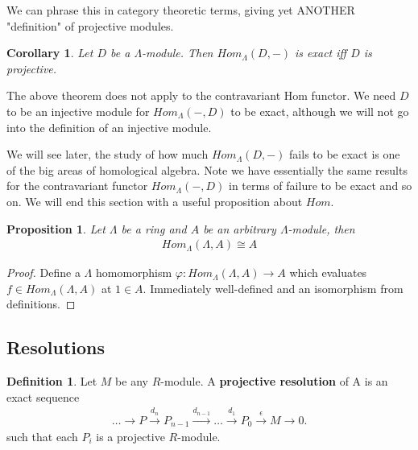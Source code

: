 \documentclass[12pt]{book}
\newtheorem{proposition}[theorem]{Proposition}
\newtheorem{corollary}[theorem]{Corollary}
\theoremstyle{definition}
\newtheorem{definition}[theorem]{Definition}
\begin{document}
We can phrase this in category theoretic terms, giving yet ANOTHER "definition" of projective modules. 
\begin{corollary}
    Let $D$ be a $\Lambda$-module. Then $Hom_\Lambda(D, -)$ is exact iff $D$ is projective. 
\end{corollary}

The above theorem does not apply to the contravariant Hom functor. We need $D$ to be an injective module for $Hom_\Lambda(-,D)$ to be exact, although we will not go into the definition of an injective module. 

We will see later, the study of how much $Hom_\Lambda(D, -)$ fails to be exact is one of the big areas of homological algebra. Note we have essentially the same results for the contravariant functor $Hom_\Lambda(-, D)$ in terms of failure to be exact and so on. We will end this section with a useful proposition about $Hom$.

\begin{proposition}\label{Homid}
    Let $\Lambda$ be a ring and $A$ be an arbitrary $\Lambda$-module, then 
    \begin{align*}
        Hom_\Lambda(\Lambda, A) \cong A
    \end{align*}
\end{proposition}
\begin{proof}
    Define a $\Lambda$ homomorphism $\varphi : Hom_\Lambda(\Lambda, A) \to A$ which evaluates $f \in Hom_\Lambda(\Lambda, A)$ at $1 \in A$. Immediately well-defined and an isomorphism from definitions. 
\end{proof}



\subsection{Resolutions}

\begin{definition}
    Let $M$ be any $R$-module. A \textbf{projective resolution} of A is an exact sequence 
    \begin{align*}
        \dots \rightarrow P \xrightarrow{d_n} P_{n-1} \xrightarrow{d_{n-1}} \dots \xrightarrow{d_1} P_0 \xrightarrow{\epsilon} M \rightarrow 0.  
    \end{align*}
    such that each $P_i$ is a projective $R$-module.  
\end{definition}
\end{document}
